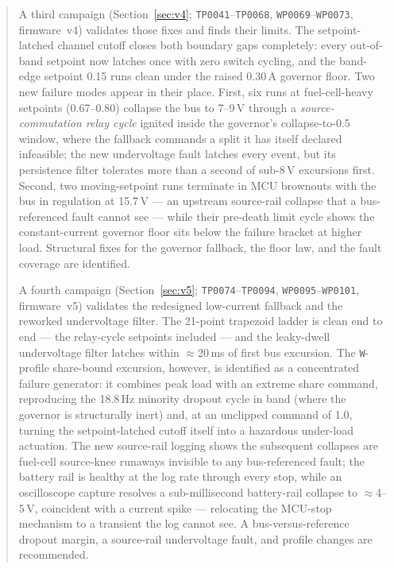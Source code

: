 \documentclass[11pt]{article}
\newcommand{\code}[1]{\texttt{#1}}
\begin{document}
\begin{abstract}
A third campaign (Section~\ref{sec:v4}; \code{TP0041}--\code{TP0068},
\code{WP0069}--\code{WP0073}, firmware~v4) validates those fixes and finds their
limits. The setpoint-latched channel cutoff closes both boundary gaps completely:
every out-of-band setpoint now latches once with zero switch cycling, and the
band-edge setpoint 0.15 runs clean under the raised 0.30\,A governor floor. Two new
failure modes appear in their place. First, six runs at fuel-cell-heavy setpoints
(0.67--0.80) collapse the bus to 7--9\,V through a \emph{source-commutation relay
cycle} ignited inside the governor's collapse-to-0.5 window, where the fallback
commands a split it has itself declared infeasible; the new undervoltage fault
latches every event, but its persistence filter tolerates more than a second of
sub-8\,V excursions first. Second, two moving-setpoint runs terminate in MCU
brownouts with the bus in regulation at 15.7\,V --- an upstream source-rail collapse
that a bus-referenced fault cannot see --- while their pre-death limit cycle shows
the constant-current governor floor sits below the failure bracket at higher load.
Structural fixes for the governor fallback, the floor law, and the fault coverage
are identified.

A fourth campaign (Section~\ref{sec:v5}; \code{TP0074}--\code{TP0094},
\code{WP0095}--\code{WP0101}, firmware~v5) validates the redesigned low-current
fallback and the reworked undervoltage filter. The 21-point trapezoid ladder is
clean end to end --- the relay-cycle setpoints included --- and the leaky-dwell
undervoltage filter latches within $\approx$20\,ms of first bus excursion. The
\code{W}-profile share-bound excursion, however, is identified as a
concentrated failure generator: it combines peak load with an extreme share
command, reproducing the 18.8\,Hz minority dropout cycle in band (where the
governor is structurally inert) and, at an unclipped command of 1.0, turning
the setpoint-latched cutoff itself into a hazardous under-load actuation. The
new source-rail logging shows the subsequent collapses are fuel-cell
source-knee runaways invisible to any bus-referenced fault; the battery rail
is healthy at the log rate through every stop, while an oscilloscope capture
resolves a sub-millisecond battery-rail collapse to $\approx$4--5\,V,
coincident with a current spike --- relocating the MCU-stop mechanism to a
transient the log cannot see. A bus-versus-reference dropout
margin, a source-rail undervoltage fault, and profile changes are recommended.


\end{abstract}
\end{document}
